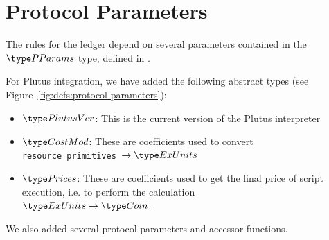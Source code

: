 \section{Protocol Parameters}
\label{sec:protocol-parameters}

The rules for the ledger depend on several parameters contained in the $\PParams$ type,
defined in \cite{byron_ledger_spec}.

For Plutus integration, we have added the following abstract types
(see Figure~\ref{fig:defs:protocol-parameters}):

\begin{itemize}
\item $\PlutusVer$: This is the current version of the Plutus interpreter
\item $\CostMod$: These are coefficients used to convert \\
\texttt{resource primitives}~$\to \ExUnits$
\item $\Prices$: These are coefficients used to get the final price of script
execution, i.e. to perform the calculation \\
$\ExUnits \to \Coin$.
\end{itemize}

We also added several protocol parameters and accessor functions. 


